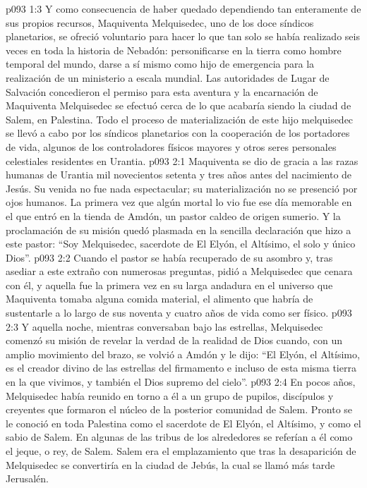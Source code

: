 \vs p093 1:3 Y como consecuencia de haber quedado dependiendo tan enteramente de sus propios recursos, Maquiventa Melquisedec, uno de los doce síndicos planetarios, se ofreció voluntario para hacer lo que tan solo se había realizado seis veces en toda la historia de Nebadón: personificarse en la tierra como hombre temporal del mundo, darse a sí mismo como hijo de emergencia para la realización de un ministerio a escala mundial. Las autoridades de Lugar de Salvación concedieron el permiso para esta aventura y la encarnación de Maquiventa Melquisedec se efectuó cerca de lo que acabaría siendo la ciudad de Salem, en Palestina. Todo el proceso de materialización de este hijo melquisedec se llevó a cabo por los síndicos planetarios con la cooperación de los portadores de vida, algunos de los controladores físicos mayores y otros seres personales celestiales residentes en Urantia.
\vs p093 2:1 Maquiventa se dio de gracia a las razas humanas de Urantia mil novecientos setenta y tres años antes del nacimiento de Jesús. Su venida no fue nada espectacular; su materialización no se presenció por ojos humanos. La primera vez que algún mortal lo vio fue ese día memorable en el que entró en la tienda de Amdón, un pastor caldeo de origen sumerio. Y la proclamación de su misión quedó plasmada en la sencilla declaración que hizo a este pastor: “Soy Melquisedec, sacerdote de El Elyón, el Altísimo, el solo y único Dios”.
\vs p093 2:2 Cuando el pastor se había recuperado de su asombro y, tras asediar a este extraño con numerosas preguntas, pidió a Melquisedec que cenara con él, y aquella fue la primera vez en su larga andadura en el universo que Maquiventa tomaba alguna comida material, el alimento que habría de sustentarle a lo largo de sus noventa y cuatro años de vida como ser físico.
\vs p093 2:3 Y aquella noche, mientras conversaban bajo las estrellas, Melquisedec comenzó su misión de revelar la verdad de la realidad de Dios cuando, con un amplio movimiento del brazo, se volvió a Amdón y le dijo: “El Elyón, el Altísimo, es el creador divino de las estrellas del firmamento e incluso de esta misma tierra en la que vivimos, y también el Dios supremo del cielo”.
\vs p093 2:4 \pc En pocos años, Melquisedec había reunido en torno a él a un grupo de pupilos, discípulos y creyentes que formaron el núcleo de la posterior comunidad de Salem. Pronto se le conoció en toda Palestina como el sacerdote de El Elyón, el Altísimo, y como el sabio de Salem. En algunas de las tribus de los alrededores se referían a él como el jeque, o rey, de Salem. Salem era el emplazamiento que tras la desaparición de Melquisedec se convertiría en la ciudad de Jebús, la cual se llamó más tarde Jerusalén.

